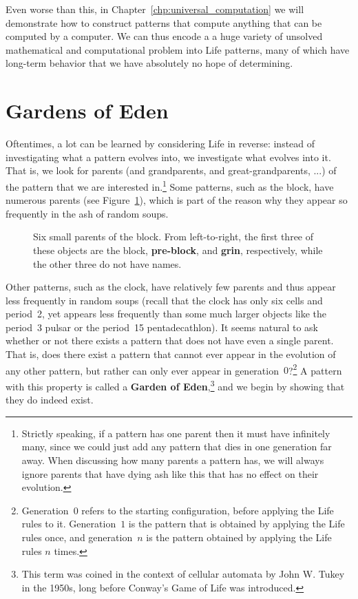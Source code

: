 Even worse than this, in Chapter~\ref{chp:universal_computation} we will demonstrate how to construct patterns that compute anything that can be computed by a computer. We can thus encode a a huge variety of unsolved mathematical and computational problem into Life patterns, many of which have long-term behavior that we have absolutely no hope of determining.


\section{Gardens of Eden}\label{sec:goe}

Oftentimes, a lot can be learned by considering Life in reverse: instead of investigating what a pattern evolves into, we investigate what evolves into it. That is, we look for parents (and grandparents, and great-grandparents, ...) of the pattern that we are interested in.\footnote{Strictly speaking, if a pattern has one parent then it must have infinitely many, since we could just add any pattern that dies in one generation far away. When discussing how many parents a pattern has, we will always ignore parents that have dying ash like this that has no effect on their evolution.} Some patterns, such as the block, have numerous parents (see Figure~\ref{fig:block_parents}), which is part of the reason why they appear so frequently in the ash of random soups.

\begin{figure}[!htb]
	\centering{}
	\caption{Six small parents of the block. From left-to-right, the first three of these objects are the block, \textbf{pre-block}, and \textbf{grin}, respectively, while the other three do not have names.}\label{fig:block_parents}
\end{figure}

Other patterns, such as the clock, have relatively few parents and thus appear less frequently in random soups (recall that the clock has only six cells and period~2, yet appears less frequently than some much larger objects like the period~3 pulsar or the period~15 pentadecathlon). It seems natural to ask whether or not there exists a pattern that does not have even a single parent. That is, does there exist a pattern that cannot ever appear in the evolution of any other pattern, but rather can only ever appear in generation~$0$?\footnote{Generation~$0$ refers to the starting configuration, before applying the Life rules to it. Generation~$1$ is the pattern that is obtained by applying the Life rules once, and generation~$n$ is the pattern obtained by applying the Life rules $n$ times.} A pattern with this property is called a \textbf{Garden of Eden},\footnote{This term was coined in the context of cellular automata by John W. Tukey in the 1950s, long before Conway's Game of Life was introduced.} and we begin by showing that they do indeed exist.

